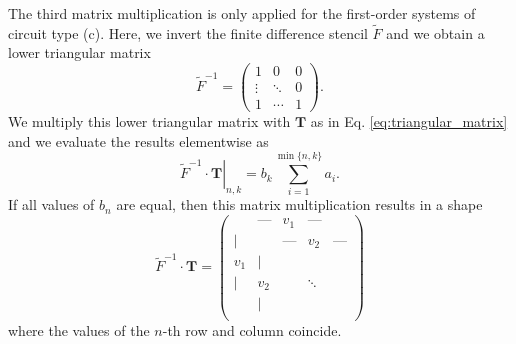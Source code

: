 \documentclass[a4paper, 10pt, twoside, twocolumn]{scrartcl}
\begin{document}
The third matrix multiplication is only applied for the first-order systems of circuit type (c). Here, we invert the finite difference stencil $\tilde{F}$ and we obtain a lower triangular matrix
\begin{equation*}
	\tilde{F}^{-1} =
	 	\begin{pmatrix}
	 	1 & 0  &  0\\
	 	\vdots 	& \ddots &  0 \\
	 	1 &	\cdots	 &     1 
	 \end{pmatrix} \text{.}
\end{equation*}
We multiply this lower triangular matrix with $\mathbf{T}$ as in Eq. \eqref{eq:triangular_matrix} and we evaluate the results elementwise as
\begin{equation}
	\left. \tilde{F}^{-1} \cdot \mathbf{T}  \right\rvert_{n,k} = b_{k} \sum_{i=1}^{\min\{n,k\}} a_{i} \text{.}
\end{equation}
If all values of $b_{n}$ are equal, then this matrix multiplication results in a shape
\begin{equation*}
	\tilde{F}^{-1} \cdot \mathbf{T} =
	\begin{pmatrix}
		 & \text{---} & v_{1} & \text{---} & \\
		| & & \text{---} & v_{2} & \text{---} \\
		v_{1} & | & & &  \\
		| & v_{2} & & \ddots & \\
		& | &  & & \\
	\end{pmatrix}
\end{equation*}
where the values of the $n$-th row and column coincide.
\end{document}
